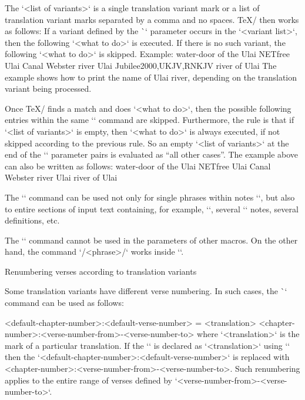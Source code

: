The `<list of variants>` is a single translation variant mark or a list of translation variant marks separated by a comma and no spaces.  \TeX/ then works as follows:
If a variant defined by the \`\tmark` parameter occurs in the `<variant list>`, then
the following `<what to do>` is executed. If there is no such variant,
the following `<what to do>` is skipped. Example:
\begtt
{}         {water-door of the Ulai}%
        {NETfree}     {Ulai Canal}%
        {Webster}     {river Ulai}%
        {Jubilee2000,UKJV,RNKJV} {river of Ulai} %
 \endtt
The example shows how to print the name of Ulai river, depending on
the translation variant being processed.

Once \TeX/ finds a match and does `<what to do>`, then the possible following
entries within the same `\switch` command are skipped. Furthermore, the rule is that
if `<list of variants>` is empty, then `<what to do>` is always executed, if
not skipped according to the previous rule. So an empty `<list of variants>` 
at the end of the `\switch` parameter pairs is evaluated as “all other
cases”. The example above can also be written as follows:
\begtt
{}         {water-door of the Ulai}%
        {NETfree}     {Ulai Canal}%
        {Webster}     {river Ulai}%
        {}            {river of Ulai}           %
\endtt

The `\switch` command can be used not only for single phrases within notes
`\Note`, but also to entire sections of input text containing, for example, `\Note`,
several `\Note` notes, several definitions, etc.

The `\switch` command cannot be used in the parameters of other macros. On the other hand, the
command `\x/<phrase>/` works inside `\switch`.




\secc[renum] Renumbering verses according to translation variants

Some translation variants have different verse numbering. In such cases, the
\`\renum` command can be used as follows:

\begtt
{} <default-chapter-number>:<default-verse-number> = <translation> 
<chapter-number>:<verse-number-from>-<verse-number-to>
\endtt
where `<translation>` is the mark of a particular translation. If the `\tmark` is declared as `<translation>` using `\def\tmark{<translation>}` then
the `<default-chapter-number>:<default-verse-number>`  is replaced with
<chapter-number>:<verse-number-from>-<verse-number-to>.
Such renumbering applies to the entire range of verses defined by `<verse-number-from>-<verse-number-to>`.

